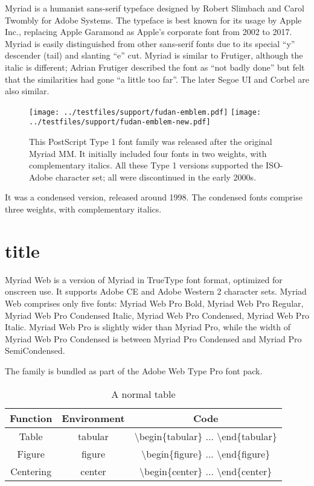\documentclass[twoside]{fduthesis-en}
\begin{document}
Myriad is a humanist sans-serif typeface designed by Robert Slimbach
and Carol Twombly for Adobe Systems. The typeface is best known for
its usage by Apple Inc., replacing Apple Garamond as Apple's corporate
font from 2002 to 2017. Myriad is easily distinguished from other
sans-serif fonts due to its special ``y'' descender (tail) and slanting
``e'' cut. Myriad is similar to Frutiger, although the italic is different;
Adrian Frutiger described the font as ``not badly done'' but felt that
the similarities had gone ``a little too far''. The later Segoe UI and
Corbel are also similar.

\begin{figure}[h]
  \centering
  \texttt{[image: ../testfiles/support/fudan-emblem.pdf]}
  \texttt{[image: ../testfiles/support/fudan-emblem-new.pdf]}
  \caption{This PostScript Type 1 font family was released after the
    original Myriad MM. It initially included four fonts in two weights,
    with complementary italics. All these Type 1 versions supported
    the ISO-Adobe character set; all were discontinued in the early 2000s.}
\end{figure}

It was a condensed version, released around 1998. The condensed fonts
comprise three weights, with complementary italics.

\section{title}

Myriad Web is a version of Myriad in TrueType font format, optimized
for onscreen use. It supports Adobe CE and Adobe Western 2 character
sets. Myriad Web comprises only five fonts: Myriad Web Pro Bold, Myriad
Web Pro Regular, Myriad Web Pro Condensed Italic, Myriad Web Pro Condensed,
Myriad Web Pro Italic. Myriad Web Pro is slightly wider than Myriad Pro,
while the width of Myriad Web Pro Condensed is between Myriad Pro
Condensed and Myriad Pro SemiCondensed.

The family is bundled as part of the Adobe Web Type Pro font pack.

\begin{table}[h]
  \centering
  \caption{A normal table}
  \begin{tabular}{ccc}
    \hline
    \bfseries Function & \bfseries Environment & \bfseries Code \\
    \hline
    Table     & tabular & \ttfamily \backslash begin\{tabular\} ... \backslash end\{tabular\} \\
    Figure    & figure  & \ttfamily \backslash begin\{figure\}  ... \backslash end\{figure\}  \\
    Centering & center  & \ttfamily \backslash begin\{center\}  ... \backslash end\{center\}  \\
    \hline
  \end{tabular}
\end{table}
\end{document}
